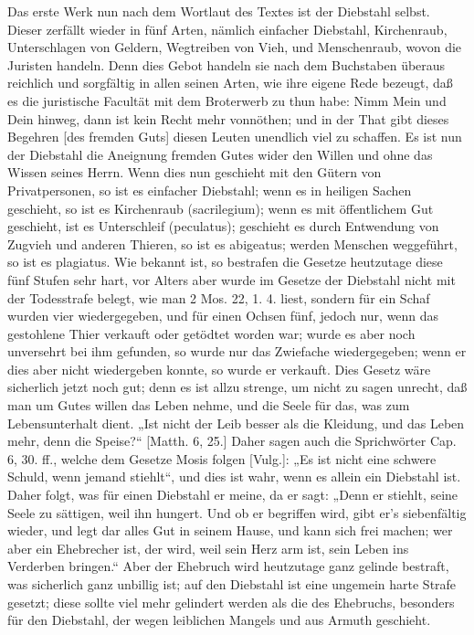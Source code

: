 Das erste Werk nun nach dem Wortlaut des Textes ist der Diebstahl selbst. Dieser zerfällt wieder in fünf Arten, nämlich einfacher Diebstahl, Kirchenraub, Unterschlagen von Geldern, Wegtreiben von Vieh, und Menschenraub, wovon die Juristen handeln. Denn dies Gebot handeln sie nach dem Buchstaben überaus reichlich und sorgfältig in allen seinen Arten, wie ihre eigene Rede bezeugt, daß es die juristische Facultät mit dem Broterwerb zu thun habe: Nimm Mein und Dein hinweg, dann ist kein Recht mehr vonnöthen; und in der That gibt dieses Begehren [des fremden Guts] diesen Leuten unendlich viel zu schaffen. Es ist nun der Diebstahl die Aneignung fremden Gutes wider den Willen und ohne das Wissen seines Herrn. Wenn dies nun geschieht mit den Gütern von Privatpersonen, so ist es einfacher Diebstahl; wenn es in heiligen Sachen geschieht, so ist es Kirchenraub (sacrilegium); wenn es mit öffentlichem Gut geschieht, ist es Unterschleif (peculatus); geschieht es durch Entwendung von Zugvieh und anderen Thieren, so ist es abigeatus; werden Menschen weggeführt, so ist es plagiatus. Wie bekannt ist, so bestrafen die Gesetze heutzutage
diese fünf Stufen sehr hart, vor Alters aber wurde im Gesetze der Diebstahl nicht mit der Todesstrafe belegt, wie man 2 Mos. 22, 1. 4. liest, sondern für ein Schaf wurden vier wiedergegeben, und für einen Ochsen fünf, jedoch nur, wenn das gestohlene Thier verkauft oder getödtet worden war; wurde es aber noch unversehrt bei ihm gefunden, so wurde nur das Zwiefache wiedergegeben; wenn er dies aber nicht wiedergeben konnte, so wurde er verkauft. Dies Gesetz wäre sicherlich jetzt noch gut; denn es ist allzu strenge, um nicht zu sagen unrecht, daß man um Gutes willen das Leben nehme, und die Seele für das, was zum Lebensunterhalt dient. „Ist nicht der Leib besser als die Kleidung, und das Leben mehr, denn die Speise?“ [Matth. 6, 25.] Daher sagen auch die Sprichwörter Cap. 6, 30. ff., welche dem Gesetze Mosis folgen [Vulg.]: „Es ist nicht eine schwere Schuld, wenn jemand stiehlt“, und dies ist wahr, wenn es allein ein Diebstahl ist. Daher folgt, was für einen Diebstahl er meine, da er sagt: „Denn er stiehlt, seine Seele zu sättigen, weil ihn hungert. Und ob er begriffen wird, gibt er's siebenfältig wieder, und legt dar alles Gut in seinem Hause, und kann sich frei machen; wer aber ein Ehebrecher ist, der wird, weil sein Herz arm ist, sein Leben ins Verderben bringen.“ Aber der Ehebruch wird heutzutage ganz gelinde bestraft, was sicherlich ganz unbillig ist; auf den Diebstahl ist eine ungemein harte Strafe gesetzt; diese sollte viel mehr gelindert werden als die des Ehebruchs, besonders für den Diebstahl, der wegen leiblichen Mangels und aus Armuth geschieht.

